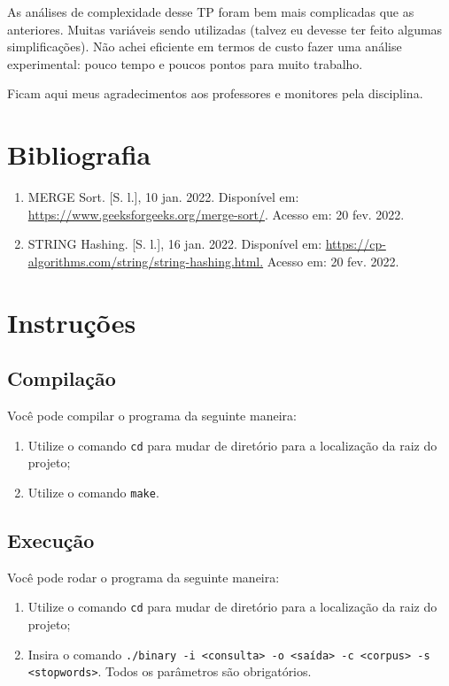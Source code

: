 \documentclass{article}
\def\code#1{\texttt{#1}}
\begin{document}
As análises de complexidade desse TP foram bem mais complicadas que as anteriores. Muitas variáveis sendo utilizadas (talvez eu devesse ter feito algumas simplificações). Não achei eficiente em termos de custo fazer uma análise experimental: pouco tempo e poucos pontos para muito trabalho.

Ficam aqui meus agradecimentos aos professores e monitores pela disciplina.

\section{Bibliografia}

\begin{enumerate}

	\item MERGE Sort. [S. l.], 10 jan. 2022. Disponível em: \url{https://www.geeksforgeeks.org/merge-sort/}. Acesso em: 20 fev. 2022.

	\item STRING Hashing. [S. l.], 16 jan. 2022. Disponível em: \url{https://cp-algorithms.com/string/string-hashing.html.} Acesso em: 20 fev. 2022.

\end{enumerate}


\newpage
\section*{Instruções}

\subsection*{Compilação}

Você pode compilar o programa da seguinte maneira:

\begin{enumerate}
	\item Utilize o comando \code{cd} para mudar de diretório para a localização da raiz do projeto;
	\item Utilize o comando \code{make}.
\end{enumerate}

\subsection*{Execução}

Você pode rodar o programa da seguinte maneira:

\begin{enumerate}
	\item Utilize o comando \code{cd} para mudar de diretório para a localização da raiz do projeto;
	\item Insira o comando \code{./binary -i <consulta> -o <saída> -c <corpus> -s <stopwords>}. Todos os parâmetros são obrigatórios.
\end{enumerate}
\end{document}
